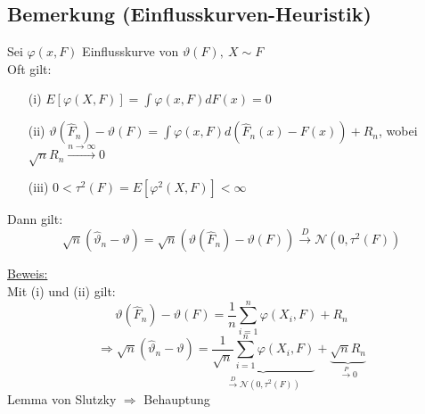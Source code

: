 \documentclass[a4paper,11pt,twoside,titlepage]{article}
\newcommand\NN{ \mathcal{N} } %
\begin{document}
\subsection{Bemerkung (Einflusskurven-Heuristik)}
Sei $\varphi(x,F)$ Einflusskurve von $\vartheta(F),\ X\sim F$\\
Oft gilt:
\begin{itemize}
\item[(i) ]$E[\varphi(X,F)]=\int\varphi(x,F)dF(x)=0$
\item[(ii) ]$\vartheta(\hat F_n)-\vartheta(F)=\int\varphi(x,F)d(\hat{F}_n(x)-F(x))+R_n$, wobei $\sqrt{n}R_n
\stackrel{n\to\infty}{\rightarrow}0$
\item[(iii) ]$0<\tau^2(F)=E[\varphi^2(X,F)]<\infty$
\end{itemize}
Dann gilt:
$$\sqrt{n}(\hat\vartheta_n-\vartheta)=\sqrt{n}(\vartheta(\hat{F}_n)-\vartheta(F))\stackrel{D}{\rightarrow}\NN(0,\tau^2(F))$$

\underline{Beweis:}\\
Mit (i) und (ii) gilt:
$$\vartheta(\hat F_n)-\vartheta(F)=\frac1n\sum_{i=1}^n\varphi(X_i,F)+R_n$$
$$\Rightarrow \sqrt n(\hat\vartheta_n-\vartheta)=\underbrace{\frac{1}{\sqrt n}\sum_{i=1}^n\varphi(X_i,F)}_{
\stackrel{D}{\rightarrow}\NN(0,\tau^2(F))}+\underbrace{\sqrt nR_n}_{\stackrel{P}{\rightarrow}0}$$
Lemma von Slutzky $\Rightarrow$ Behauptung
\end{document}
